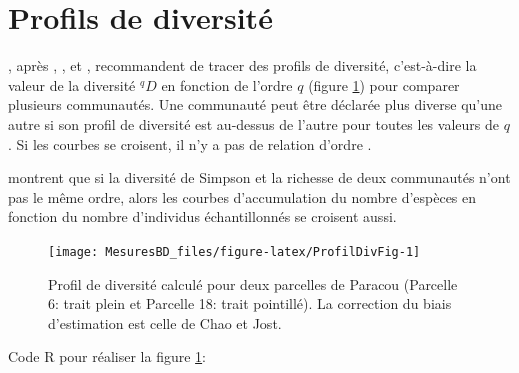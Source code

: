 \documentclass[
  11pt,
  french,
  a4paper,
  extrafontsizes,onecolumn,openright
  ]{memoir}
\newenvironment{Shaded}{\begin{snugshade}}{\end{snugshade}}
\newcommand{\DataTypeTok}[1]{\textcolor[rgb]{0.13,0.29,0.53}{#1}}
\newcommand{\DecValTok}[1]{\textcolor[rgb]{0.00,0.00,0.81}{#1}}
\newcommand{\FloatTok}[1]{\textcolor[rgb]{0.00,0.00,0.81}{#1}}
\newcommand{\KeywordTok}[1]{\textcolor[rgb]{0.13,0.29,0.53}{\textbf{#1}}}
\newcommand{\NormalTok}[1]{#1}
\newcommand{\OperatorTok}[1]{\textcolor[rgb]{0.81,0.36,0.00}{\textbf{#1}}}
\newcommand{\StringTok}[1]{\textcolor[rgb]{0.31,0.60,0.02}{#1}}
\begin{document}
\hypertarget{profils-de-diversituxe9}{%
\section{Profils de diversité}\label{profils-de-diversituxe9}}

\textcite{Leinster2012}, après \textcite{Hill1973}, \textcite{Patil1982}, \textcite{Tothmeresz1995} et \textcite{Kindt2006}, recommandent de tracer des profils de diversité, c'est-à-dire la valeur de la diversité \(^{q}\!D\) en fonction de l'ordre \(q\) (figure \ref{fig:ProfilDivFig}) pour comparer plusieurs communautés.
Une communauté peut être déclarée plus diverse qu'une autre si son profil de diversité est au-dessus de l'autre pour toutes les valeurs de \(q\).
Si les courbes se croisent, il n'y a pas de relation d'ordre \autocite{Tothmeresz1995}.

\textcite{Lande2000} montrent que si la diversité de Simpson et la richesse de deux communautés n'ont pas le même ordre, alors les courbes d'accumulation du nombre d'espèces en fonction du nombre d'individus échantillonnés se croisent aussi.



\scriptsize

\begin{figure}

{\centering \texttt{[image: MesuresBD\_files/figure-latex/ProfilDivFig-1]} 

}

\caption{Profil de diversité calculé pour deux parcelles de Paracou (Parcelle 6: trait plein et Parcelle 18: trait pointillé). La correction du biais d'estimation est celle de Chao et Jost.}\label{fig:ProfilDivFig}
\end{figure}

\normalsize

Code R pour réaliser la figure \ref{fig:ProfilDivFig}:

\scriptsize

\begin{Shaded}
\end{Shaded}
\end{document}

